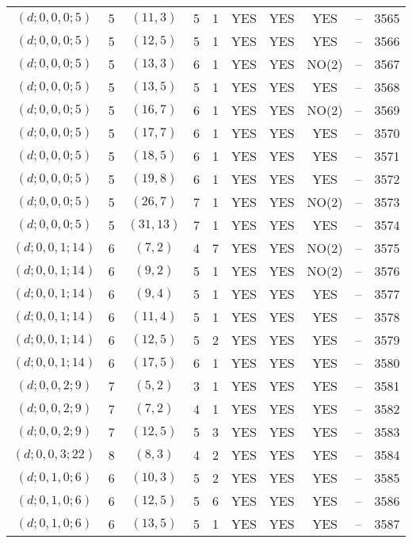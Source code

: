 \begin{longtable}{|c|c|c|c|c|c|c|c|c|c|}
$(d; 0, 0, 0; 5)$ & 5 & $(11, 3)$ & 5 & 1 & YES & YES & YES & -- & 3565\\
$(d; 0, 0, 0; 5)$ & 5 & $(12, 5)$ & 5 & 1 & YES & YES & YES & -- & 3566\\
$(d; 0, 0, 0; 5)$ & 5 & $(13, 3)$ & 6 & 1 & YES & YES & NO(2) & -- & 3567\\
$(d; 0, 0, 0; 5)$ & 5 & $(13, 5)$ & 5 & 1 & YES & YES & YES & -- & 3568\\
$(d; 0, 0, 0; 5)$ & 5 & $(16, 7)$ & 6 & 1 & YES & YES & NO(2) & -- & 3569\\
$(d; 0, 0, 0; 5)$ & 5 & $(17, 7)$ & 6 & 1 & YES & YES & YES & -- & 3570\\
$(d; 0, 0, 0; 5)$ & 5 & $(18, 5)$ & 6 & 1 & YES & YES & YES & -- & 3571\\
$(d; 0, 0, 0; 5)$ & 5 & $(19, 8)$ & 6 & 1 & YES & YES & YES & -- & 3572\\
$(d; 0, 0, 0; 5)$ & 5 & $(26, 7)$ & 7 & 1 & YES & YES & NO(2) & -- & 3573\\
$(d; 0, 0, 0; 5)$ & 5 & $(31, 13)$ & 7 & 1 & YES & YES & YES & -- & 3574\\
$(d; 0, 0, 1; 14)$ & 6 & $(7, 2)$ & 4 & 7 & YES & YES & NO(2) & -- & 3575\\
$(d; 0, 0, 1; 14)$ & 6 & $(9, 2)$ & 5 & 1 & YES & YES & NO(2) & -- & 3576\\
$(d; 0, 0, 1; 14)$ & 6 & $(9, 4)$ & 5 & 1 & YES & YES & YES & -- & 3577\\
$(d; 0, 0, 1; 14)$ & 6 & $(11, 4)$ & 5 & 1 & YES & YES & YES & -- & 3578\\
$(d; 0, 0, 1; 14)$ & 6 & $(12, 5)$ & 5 & 2 & YES & YES & YES & -- & 3579\\
$(d; 0, 0, 1; 14)$ & 6 & $(17, 5)$ & 6 & 1 & YES & YES & YES & -- & 3580\\
$(d; 0, 0, 2; 9)$ & 7 & $(5, 2)$ & 3 & 1 & YES & YES & YES & -- & 3581\\
$(d; 0, 0, 2; 9)$ & 7 & $(7, 2)$ & 4 & 1 & YES & YES & YES & -- & 3582\\
$(d; 0, 0, 2; 9)$ & 7 & $(12, 5)$ & 5 & 3 & YES & YES & YES & -- & 3583\\
$(d; 0, 0, 3; 22)$ & 8 & $(8, 3)$ & 4 & 2 & YES & YES & YES & -- & 3584\\
$(d; 0, 1, 0; 6)$ & 6 & $(10, 3)$ & 5 & 2 & YES & YES & YES & -- & 3585\\
$(d; 0, 1, 0; 6)$ & 6 & $(12, 5)$ & 5 & 6 & YES & YES & YES & -- & 3586\\
$(d; 0, 1, 0; 6)$ & 6 & $(13, 5)$ & 5 & 1 & YES & YES & YES & -- & 3587\\

\end{longtable}
